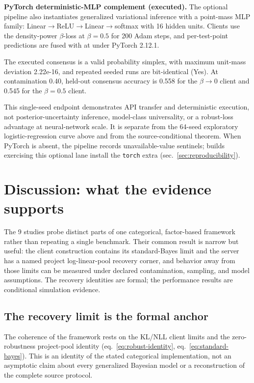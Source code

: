 \documentclass[
  english,
]{article}
\theoremstyle{plain}
\theoremstyle{definition}
\theoremstyle{remark}
\theoremstyle{definition}
\begin{document}
\textbf{PyTorch deterministic-MLP complement (executed).} The optional
pipeline also instantiates generalized variational inference with a
point-mass MLP family: Linear\texorpdfstring{\ensuremath{\to}}{->}ReLU\texorpdfstring{\ensuremath{\to}}{->}Linear\texorpdfstring{\ensuremath{\to}}{->}softmax with 16 hidden units.
Clients use the density-power \(\beta\)-loss at \(\beta = 0.5\) for 200
Adam steps, and per-test-point predictions are fused with
 at  under PyTorch
2.12.1.

The executed consensus is a valid probability simplex, with maximum
unit-mass deviation 2.22e-16, and repeated seeded runs are bit-identical
(Yes). At contamination 0.40, held-out consensus accuracy is 0.558 for
the \(\beta\to 0\) client and 0.545 for the \(\beta=0.5\) client.

This single-seed endpoint demonstrates API transfer and deterministic
execution, not posterior-uncertainty inference, model-class
universality, or a robust-loss advantage at neural-network scale. It is
separate from the 64-seed exploratory logistic-regression curve above
and from the source-conditional theorem. When PyTorch is absent, the
pipeline records unavailable-value sentinels; builds exercising this
optional lane install the \texttt{torch} extra
(sec.~\ref{sec:reproducibility}).

\section{Discussion: what the evidence supports}\label{sec:discussion}

The 9 studies probe distinct parts of one categorical, factor-based
framework rather than repeating a single benchmark. Their common result
is narrow but useful: the client construction contains its
standard-Bayes limit and the server has a named project log-linear-pool
recovery corner, and behavior away from those limits can be measured
under declared contamination, sampling, and model assumptions. The
recovery identities are formal; the performance results are conditional
simulation evidence.

\subsection{The recovery limit is the formal
anchor}\label{sec:discussion-limit}

The coherence of the framework rests on the KL/NLL client limits and the
zero-robustness project-pool identity (eq.~\ref{eq:robust-identity},
eq.~\ref{eq:standard-bayes}). This is an identity of the stated
categorical implementation, not an asymptotic claim about every
generalized Bayesian model or a reconstruction of the complete source
protocol.
\end{document}
